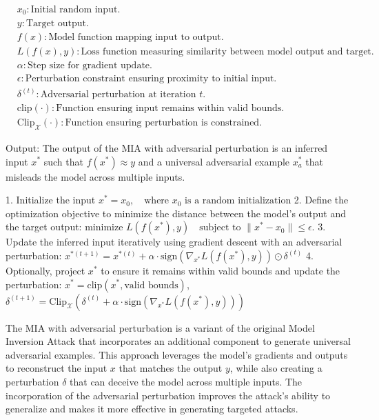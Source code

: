 \begin{align*}
    & x_0: \text{Initial random input.} \\
    & y: \text{Target output.} \\
    & f(x): \text{Model function mapping input to output.} \\
    & L(f(x), y): \text{Loss function measuring similarity between model output and target.} \\
    & \alpha: \text{Step size for gradient update.} \\
    & \epsilon: \text{Perturbation constraint ensuring proximity to initial input.} \\
    & \delta^{(t)}: \text{Adversarial perturbation at iteration } t. \\
    & \text{clip}(\cdot): \text{Function ensuring input remains within valid bounds.} \\
    & \text{Clip}_{\mathcal{X}}(\cdot): \text{Function ensuring perturbation is constrained.}
\end{align*}

Output: The output of the MIA with adversarial perturbation is an inferred input $x^*$ such that $f(x^*) \approx y$ and a universal adversarial example $x^*_a$ that misleads the model across multiple inputs.

1. Initialize the input $x^* = x_0, \quad \text{where } x_0 \text{ is a random initialization}$
2. Define the optimization objective to minimize the distance between the model's output and the target output:
   $\text{minimize } L(f(x^*), y) \quad \text{subject to } \|x^* - x_0\| \leq \epsilon.$
3. Update the inferred input iteratively using gradient descent with an adversarial perturbation:
   $x^{*(t+1)} = x^{*(t)} + \alpha \cdot \text{sign}(\nabla_{x^*} L(f(x^*), y)) \odot \delta^{(t)}$
4. Optionally, project $x^*$ to ensure it remains within valid bounds and update the perturbation:
   $x^* = \text{clip}(x^*, \text{valid bounds})$, $\delta^{(t+1)} = \text{Clip}_{\mathcal{X}} (\delta^{(t)} + \alpha \cdot \text{sign}(\nabla_{x^*} L(f(x^*), y)) )$

The MIA with adversarial perturbation is a variant of the original Model Inversion Attack that incorporates an additional component to generate universal adversarial examples. This approach leverages the model's gradients and outputs to reconstruct the input $x$ that matches the output $y$, while also creating a perturbation $\delta$ that can deceive the model across multiple inputs. The incorporation of the adversarial perturbation improves the attack's ability to generalize and makes it more effective in generating targeted attacks.